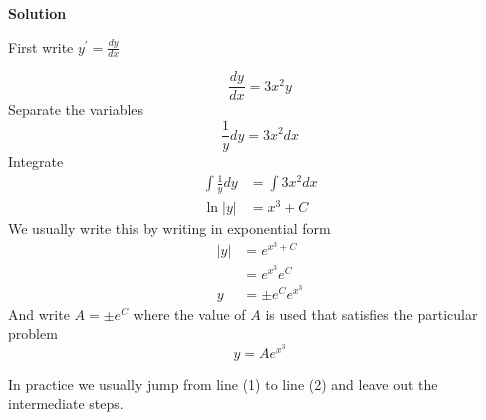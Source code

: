 \textbf{Solution} 

First write $y^{ \prime } =\frac{d y}{d x}$ 

\begin{equation*}\frac{d y}{d x} =3 x^{2} y
\end{equation*}Separate the variables
\begin{equation*}\frac{1}{y} d y =3 x^{2} d x
\end{equation*}Integrate
\begin{align}\int \frac{1}{y} d y &    = \int 3 x^{2} d x \nonumber  \\
\ln  \left \vert y\right \vert  &    = x^{3} +C \tag{1}\end{align}We usually write this by writing in exponential form
\begin{align*}\left \vert y\right \vert  &    = e^{x^{3} +C} \\
 &    = e^{x^{3}} e^{C} \\
y &    =  \pm e^{C} e^{x^{3}}\end{align*}And write $A = \pm e^{C}$ where the value of $A$ is used that satisfies the particular problem
\begin{equation}y =A e^{x^{3}}\tag{2}
\end{equation}

In practice we usually jump from line (1) to line (2) and leave out the intermediate steps. 

